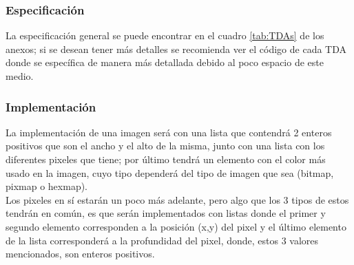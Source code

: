   \subsubsection{Especificación}
    La especificación general se puede encontrar en el cuadro \ref{tab:TDAs} de los anexos;
    si se desean tener más detalles se recomienda ver el código de cada TDA donde se específica
    de manera más detallada debido al poco espacio de este medio.

  \subsubsection{Implementación}
    La implementación de una imagen será con una lista que contendrá 2 enteros positivos que son el ancho y el alto de la misma, junto
    con una lista con los diferentes pixeles que tiene; por último tendrá un elemento con el color más
    usado en la imagen, cuyo tipo dependerá del tipo de imagen que sea (bitmap, pixmap o hexmap).\\

    Los pixeles en sí estarán un poco más adelante, pero algo que los 3 tipos de estos tendrán en común, es que serán implementados con listas 
    donde el primer y segundo elemento corresponden a la posición (x,y) del pixel y el último elemento de la lista
    corresponderá a la profundidad del pixel, donde, estos 3 valores mencionados, son enteros positivos.\\

